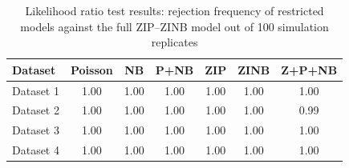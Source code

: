 \begin{table}[!h]
\caption{Likelihood ratio test results: rejection frequency of restricted models against the full ZIP--ZINB model out of 100 simulation replicates}
\centering
\begin{tabular}{lcccccc}
\toprule
Dataset & Poisson & NB & P+NB & ZIP & ZINB & Z+P+NB \\
\midrule
Dataset 1 & 1.00 & 1.00 & 1.00 & 1.00 & 1.00 & 1.00 \\
Dataset 2 & 1.00 & 1.00 & 1.00 & 1.00 & 1.00 & 0.99 \\
Dataset 3 & 1.00 & 1.00 & 1.00 & 1.00 & 1.00 & 1.00 \\
Dataset 4 & 1.00 & 1.00 & 1.00 & 1.00 & 1.00 & 1.00 \\
\bottomrule
\end{tabular}
\label{tab:sim_lrt}
\end{table}
